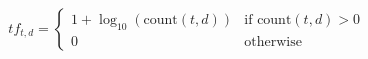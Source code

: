 \documentclass[preview]{standalone}
\begin{document}
\begin{align*}
tf_{t,d} = \begin{cases} 1 + \log_{10}(\text{count}(t,d)) & \text{if } \text{count}(t,d) > 0 \\ 0 & \text{otherwise} \end{cases}
\end{align*}
\end{document}
